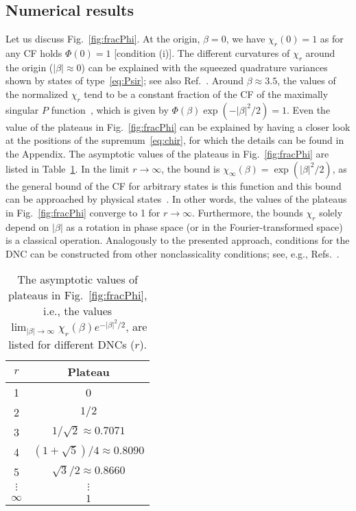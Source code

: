 \documentclass[aps,pra,twocolumn,showpacs,superscriptaddress,10pt]{revtex4-1}
\begin{document}
\subsection{Numerical results}
	Let us discuss Fig.~\ref{fig:fracPhi}.
	At the origin, $\beta=0$, we have $\chi_r(0)=1$ as for any CF holds $\Phi(0)=1$ [condition (i)].
	The different curvatures of $\chi_r$ around the origin ($|\beta|\approx0$) can be explained with the squeezed quadrature variances shown by states of type~\eqref{eq:Psir}; see also Ref.~\cite{Mraz2014}.
	Around $\beta\approx3.5$, the values of the normalized $\chi_r$ tend to be a constant fraction of the CF of the maximally singular $P$ function~\cite{Sperling2016}, which is given by $\Phi(\beta)\exp(-|\beta|^2/2)=1$.
	Even the value of the plateaus in Fig.~\ref{fig:fracPhi} can be explained by having a closer look at the positions of the supremum~\eqref{eq:chir}, for which the details can be found in the Appendix.
	The asymptotic values of the plateaus in Fig.~\ref{fig:fracPhi} are listed in Table~\ref{tab:plateaus}.
	In the limit $r\to\infty$, the bound is $\chi_\infty(\beta)=\exp(|\beta|^2/2)$, as the general bound of the CF for arbitrary states is this function and this bound can be approached by physical states~\cite{Sperling2016}.
	In other words, the values of the plateaus in Fig.~\ref{fig:fracPhi} converge to 1 for $r\to\infty$.
	Furthermore, the bounds $\chi_r$ solely depend on $|\beta|$ as a rotation in phase space (or in the Fourier-transformed space) is a classical operation.
	Analogously to the presented approach, conditions for the DNC can be constructed from other nonclassicality conditions; see, e.g., Refs.~\cite{Richter2002,Ryl2015}.

\begin{table}[ht]
	\caption{
		The asymptotic values of plateaus in Fig.~\ref{fig:fracPhi}, i.e., the values $\lim_{|\beta|\to\infty}\chi_r(\beta)e^{-|\beta|^2/2}$, are listed for different DNCs ($r$).
		}\label{tab:plateaus}
	\begin{tabular}{cc}
		\hline\hline
		$r$&Plateau\\\hline
		1 & 0\\
		2 & $1/2$\\
		3 & $1/\sqrt{2}\approx0.7071$\\
		4 & $(1+\sqrt{5})/4\approx0.8090$\\
		5 & $\sqrt{3}/2\approx0.8660$ \\
		$\vdots$ & $\vdots$ \\
		$\infty$ & $1$ \\
		\hline\hline
	\end{tabular}
\end{table}
	
\end{document}
